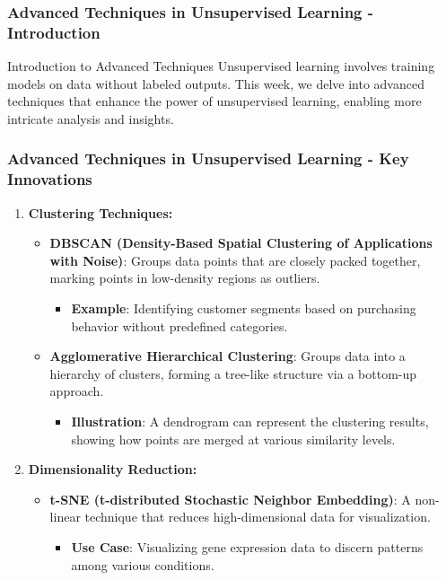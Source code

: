 \documentclass[aspectratio=169]{beamer}
\begin{document}
\begin{frame}[fragile]
    \frametitle{Advanced Techniques in Unsupervised Learning - Introduction}
    \begin{block}{Introduction to Advanced Techniques}
        Unsupervised learning involves training models on data without labeled outputs. 
        This week, we delve into advanced techniques that enhance the power of unsupervised learning, enabling more intricate analysis and insights.
    \end{block}
\end{frame}

\begin{frame}[fragile]
    \frametitle{Advanced Techniques in Unsupervised Learning - Key Innovations}
    \begin{enumerate}
        \item \textbf{Clustering Techniques:}
        \begin{itemize}
            \item \textbf{DBSCAN (Density-Based Spatial Clustering of Applications with Noise)}: 
            Groups data points that are closely packed together, marking points in low-density regions as outliers.
            \begin{itemize}
                \item \textbf{Example}: Identifying customer segments based on purchasing behavior without predefined categories.
            \end{itemize}
            \item \textbf{Agglomerative Hierarchical Clustering}: 
            Groups data into a hierarchy of clusters, forming a tree-like structure via a bottom-up approach.
            \begin{itemize}
                \item \textbf{Illustration}: A dendrogram can represent the clustering results, showing how points are merged at various similarity levels.
            \end{itemize}
        \end{itemize}
        \item \textbf{Dimensionality Reduction:}
        \begin{itemize}
            \item \textbf{t-SNE (t-distributed Stochastic Neighbor Embedding)}: 
            A non-linear technique that reduces high-dimensional data for visualization.
            \begin{itemize}
                \item \textbf{Use Case}: Visualizing gene expression data to discern patterns among various conditions.

\end{itemize}
\end{itemize}
\end{enumerate}
\end{frame}
\end{document}

